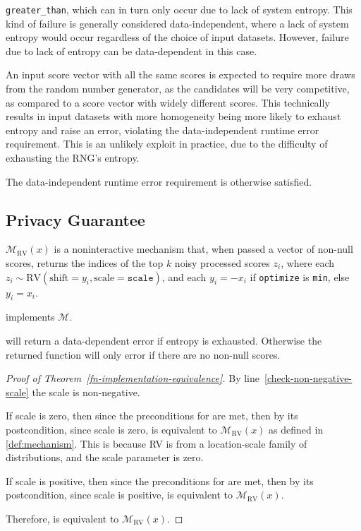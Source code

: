 \documentclass{article}
\begin{document}
\texttt{greater\_than}, which can in turn only occur due to lack of system entropy.
This kind of failure is generally considered data-independent, where a lack of system entropy would occur regardless of the choice of input datasets.
However, failure due to lack of entropy can be data-dependent in this case.

An input score vector with all the same scores 
is expected to require more draws from the random number generator,
as the candidates will be very competitive, 
as compared to a score vector with widely different scores. 
This technically results in input datasets with more homogeneity being more likely to exhaust entropy and raise an error,
violating the data-independent runtime error requirement.
This is an unlikely exploit in practice, due to the difficulty of exhausting the RNG's entropy.

The data-independent runtime error requirement is otherwise satisfied.

\subsection{Privacy Guarantee} 

\begin{definition}
    \label{def:mechanism}
    $\mathcal{M}_{\mathrm{RV}}(x)$ is a noninteractive mechanism that,
    when passed a vector of non-null scores,
    returns the indices of the top $k$ noisy processed scores $z_i$,
    where each $z_i \sim \mathrm{RV}(\mathrm{shift}=y_i, \mathrm{scale}=\texttt{scale})$,
    and each $y_i = -x_i$ if \texttt{optimize} is \texttt{min}, else $y_i = x_i$.
\end{definition}
 
\begin{theorem}
    \label{fn-implementation-equivalence}
    \function implements $\mathcal{M}$.

    \function will return a data-dependent error if entropy is exhausted.
    Otherwise the returned function will only error if there are no non-null scores.
\end{theorem}

\begin{proof}[Proof of Theorem~\ref{fn-implementation-equivalence}]
    By line~\ref{check-non-negative-scale} the scale is non-negative.

    If scale is zero, then since the preconditions for  are met,
    then by its postcondition, since scale is zero, \function is equivalent to $\mathcal{M}_\mathrm{RV}(x)$ as defined in \ref{def:mechanism}.
    This is because RV is from a location-scale family of distributions, and the scale parameter is zero.

    If scale is positive, then since the preconditions for  are met,
    then by its postcondition, since scale is positive, \function is equivalent to $\mathcal{M}_\mathrm{RV}(x)$.

    Therefore, \function is equivalent to $\mathcal{M}_\mathrm{RV}(x)$.
\end{proof}
\end{document}
